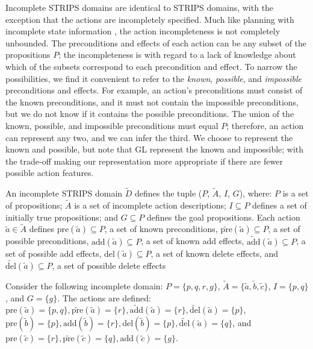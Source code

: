 \documentclass{article}
\def\citep#1{\cite{#1}}
\def\und#1{\noindent{\bf #1}:}
\newtheorem{definition}[theorem]{Definition}
\def\und#1{\medskip{\noindent\bf #1:}}
\begin{document}
\und{Incomplete STRIPS Domains}
Incomplete STRIPS domains are identical to STRIPS domains, with the exception that the actions are incompletely specified.  Much like planning with incomplete state information \citep{pff, bryce-jair}, the action incompleteness is not completely unbounded.  The preconditions and effects of each action can be any subset of the propositions $P$; the incompleteness is with regard to a lack of knowledge about which of the subsets correspond to each precondition and effect.  To narrow the possibilities, we find it convenient to refer to the {\em known}, {\em possible}, and {\em impossible} preconditions and effects.  For example, an action's preconditions must consist of the known preconditions, and it must not contain the impossible preconditions, but we do not know if it contains the possible preconditions.  The union of the known, possible, and impossible preconditions must equal $P$; therefore, an action can represent any two, and we can infer the third.  We choose to represent the known and possible, but note that GL represent the known and impossible; with the trade-off making our representation more appropriate if there are fewer possible action features.  




An incomplete STRIPS domain $\tilde{D}$  defines the tuple ($P$, $\tilde{A}$, $I$,
$G$), where: $P$ is a  set of propositions; $\tilde{A}$ is a set of incomplete action descriptions; $I \subseteq P$ defines a set of initially true propositions; and $G \subseteq P$ defines the goal propositions. Each action $\tilde{a} \in \tilde{A}$ defines $\text{pre}(\tilde{a}) \subseteq P$, a set of known preconditions, $\widetilde{\text{pre}}(\tilde{a}) \subseteq P$, a set of possible preconditions, $\text{add}(\tilde{a}) \subseteq P$, a set of known add effects,  $\widetilde{\text{add}}(\tilde{a}) \subseteq P$, a set of possible add effects, $\text{del}(\tilde{a}) \subseteq P$, a set of known delete effects, and $\widetilde{\text{del}}(\tilde{a}) \subseteq P$, a set of possible delete effects

Consider the following incomplete domain: $P = \{p, q, r, g\}$, $\tilde{A} = \{\tilde{a}, \tilde{b}, \tilde{c}\}$, $I = \{p, q\}$, and $G= \{g\}$.  The actions are defined: 
$\text{pre}(\tilde{a}) = \{p, q\}, \widetilde{\text{pre}}(\tilde{a})  = \{r\}, \widetilde{\text{add}}(\tilde{a}) = \{r\},  \widetilde{\text{del}}(\tilde{a}) = \{p\}$, $
  \text{pre}(\tilde{b}) = \{p\}, 
 \text{add}(\tilde{b}) = \{r\}, 
  \text{del}(\tilde{b}) = \{p\}, \widetilde{\text{del}}(\tilde{a}) = \{q\}$, and 
 $ \text{pre}(\tilde{c}) = \{r\}, \widetilde{\text{pre}}(\tilde{c})  = \{q\}, 
\text{add}(\tilde{c}) = \{g\}$.
\end{document}
